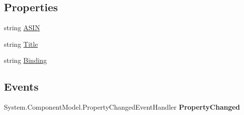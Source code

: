 \subsection*{Properties}
\begin{DoxyCompactItemize}
\item 
\hypertarget{class_price___comparison_1_1amazon_1_1ecs_1_1_item_alternate_version_abbdd2e512e2b1904e8b6bcc5a908e528}{string \hyperlink{class_price___comparison_1_1amazon_1_1ecs_1_1_item_alternate_version_abbdd2e512e2b1904e8b6bcc5a908e528}{A\-S\-I\-N}}\label{class_price___comparison_1_1amazon_1_1ecs_1_1_item_alternate_version_abbdd2e512e2b1904e8b6bcc5a908e528}

\begin{DoxyCompactList}\small\item\em \end{DoxyCompactList}\item 
\hypertarget{class_price___comparison_1_1amazon_1_1ecs_1_1_item_alternate_version_ae3178c3bbecf25156901d1805497f82f}{string \hyperlink{class_price___comparison_1_1amazon_1_1ecs_1_1_item_alternate_version_ae3178c3bbecf25156901d1805497f82f}{Title}}\label{class_price___comparison_1_1amazon_1_1ecs_1_1_item_alternate_version_ae3178c3bbecf25156901d1805497f82f}

\begin{DoxyCompactList}\small\item\em \end{DoxyCompactList}\item 
\hypertarget{class_price___comparison_1_1amazon_1_1ecs_1_1_item_alternate_version_a860e059edd9231ab59a971ef9fc2116b}{string \hyperlink{class_price___comparison_1_1amazon_1_1ecs_1_1_item_alternate_version_a860e059edd9231ab59a971ef9fc2116b}{Binding}}\label{class_price___comparison_1_1amazon_1_1ecs_1_1_item_alternate_version_a860e059edd9231ab59a971ef9fc2116b}

\begin{DoxyCompactList}\small\item\em \end{DoxyCompactList}\end{DoxyCompactItemize}
\subsection*{Events}
\begin{DoxyCompactItemize}
\item 
\hypertarget{class_price___comparison_1_1amazon_1_1ecs_1_1_item_alternate_version_af89f333d5e0433d2067319d3680637c3}{System.\-Component\-Model.\-Property\-Changed\-Event\-Handler {\bfseries Property\-Changed}}\label{class_price___comparison_1_1amazon_1_1ecs_1_1_item_alternate_version_af89f333d5e0433d2067319d3680637c3}

\end{DoxyCompactItemize}
